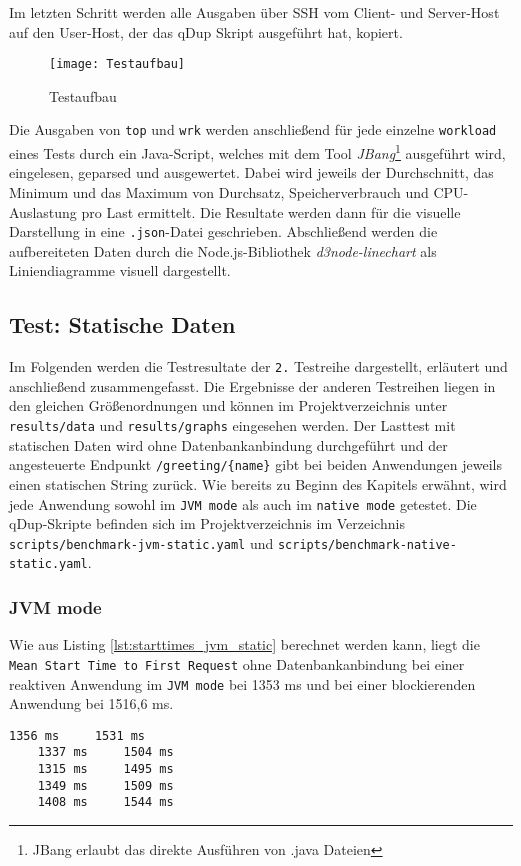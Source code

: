 Im letzten Schritt werden alle Ausgaben über SSH vom Client- und Server-Host auf den User-Host, der das qDup Skript ausgeführt hat, kopiert.

\begin{figure}[ht]
  \centering
  \texttt{[image: Testaufbau]}
  \caption{Testaufbau}
\end{figure}

Die Ausgaben von \verb|top| und \verb|wrk| werden anschließend für jede einzelne \verb|workload| eines Tests durch ein Java-Script, welches mit
dem Tool \textit{JBang}\footnote{JBang erlaubt das direkte Ausführen von .java Dateien} ausgeführt wird, eingelesen, geparsed und ausgewertet.
Dabei wird jeweils der Durchschnitt, das Minimum und das Maximum von Durchsatz, Speicherverbrauch und CPU-Auslastung pro Last ermittelt.
Die Resultate werden dann für die visuelle Darstellung in eine \verb|.json|-Datei geschrieben.
Abschließend werden die aufbereiteten Daten durch die Node.js-Bibliothek \textit{d3node-linechart} als Liniendiagramme visuell dargestellt.

\subsection{Test: Statische Daten}
\label{subsection:statische_daten}
Im Folgenden werden die Testresultate der \verb|2.| Testreihe dargestellt, erläutert und anschließend zusammengefasst.
Die Ergebnisse der anderen Testreihen liegen in den gleichen Größenordnungen und können im Projektverzeichnis unter \verb|results/data| und \verb|results/graphs| eingesehen werden.
Der Lasttest mit statischen Daten wird ohne Datenbankanbindung durchgeführt und der angesteuerte Endpunkt \verb|/greeting/{name}| gibt bei beiden Anwendungen
jeweils einen statischen String zurück. Wie bereits zu Beginn des Kapitels erwähnt, wird jede Anwendung sowohl im \verb|JVM mode| als auch im
\verb|native mode| getestet.
Die qDup-Skripte befinden sich im Projektverzeichnis im Verzeichnis \verb|scripts/benchmark-jvm-static.yaml| und
\verb|scripts/benchmark-native-static.yaml|.

\subsubsection{JVM mode}
\label{subsubsec:static_jvm_mode}
Wie aus Listing \ref{lst:starttimes_jvm_static} berechnet werden kann, liegt die \verb|Mean Start Time to First Request|
ohne Datenbankanbindung bei einer reaktiven Anwendung im \verb|JVM mode| bei 1353 ms und bei einer
blockierenden Anwendung bei 1516,6 ms.
\begin{lstlisting}[caption=Startzeiten im JVM mode mit statischen Ressourcen, captionpos=b, label=lst:starttimes_jvm_static]
    1356 ms     1531 ms
    1337 ms     1504 ms
    1315 ms     1495 ms
    1349 ms     1509 ms
    1408 ms     1544 ms
\end{lstlisting}

